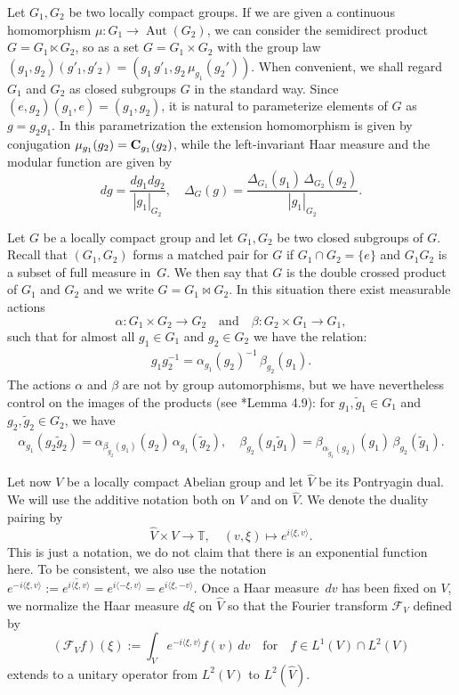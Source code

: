 \documentclass[a4paper,11pt,reqno]{amsart}
\numberwithin{equation}{section}
\theoremstyle{remark}
\theoremstyle{definition}
\newcommand\Aut{\operatorname{Aut}}
\newcommand\T{{\mathbb T}}
\newcommand{\CF}{\mathcal F}
\begin{document}
Let $G_1,G_2$ be two locally compact groups. If we are given a continuous homomorphism $\mu:G_1\to \Aut(G_2)$,
we can consider the semidirect product $G= G_1\ltimes G_2$, so as a set $G=G_1\times G_2$ with the group law
$(g_1,g_2)(g'_1,g'_2)=(g_1\,g'_1, g_2\,\mu_{g_1}(g_2'))$.
When convenient,  we shall regard $G_1$ and $G_2$ as closed subgroups $G$ in the standard way. Since
$(e,g_2)(g_1,e)=(g_1,g_2)$,  it is natural to parameterize elements of $G$ as $g=g_2g_1$.
In this parametrization
the extension homomorphism is given by conjugation $\mu_{g_1}(g_2)={\bf C}_{g_1}(g_2)$, while the left-invariant Haar measure
and the modular function are given by
$$
dg=\frac{dg_1dg_2}{|g_1|_{G_2}},\quad \Delta_G(g)=\frac{\Delta_{G_1}(g_1)\,\Delta_{G_2}(g_2)}{|g_1|_{G_2}}.
$$

Let $G$ be a locally compact group and  let $G_1,G_2$ be two closed subgroups of $G$.
Recall that $(G_1,G_2)$ forms a matched pair for $G$ if
 $G_1\cap G_2=\{e\}$ and  $G_1 G_2$ is a subset of full measure in~$G$. We then say that $G$ is the double crossed product of $G_1$
 and $G_2$ and we write $G=G_1\bowtie G_2$.
In this situation there exist  measurable actions
\begin{equation*}
\alpha :G_1\times G_2\to G_2\quad \mbox{and}\quad
\beta:G_2\times G_1\to G_1,
\end{equation*}
such that for almost all $g_1\in G_1$ and $g_2\in G_2$ we have the relation:
\begin{align*}
g_1g_2^{-1}=\alpha _{g_1}(g_2)^{-1}\,\beta_{g_2}(g_1).
\end{align*}
The actions $\alpha$ and $\beta$ are not  by group automorphisms, but we have nevertheless control
on the images of the products (see \cite{VV}*{Lemma 4.9}): for  $g_1,\tilde g_1\in G_1$ and $g_2,\tilde g_2\in G_2$, we have
\begin{align}
\label{CP}
\alpha_{g_1 }(g_2\tilde g_2)=\alpha_{\beta_{\tilde g_2}(g_1 )}(g_2 )\,\alpha_{g_1 }(\tilde g_2 ),\quad \beta_{g_2 }(g_1\tilde g_1)=\beta_{\alpha_{\tilde g_1}(g_2 )}(g_1 )\,
\beta_{g_2}(\tilde g_1).
\end{align}


Let now  $V$ be a locally compact Abelian group and let $\hat V$ be its Pontryagin dual.
 We will use the additive notation both on $V$ and  on $\hat V$.
We denote the duality pairing by
$$
\hat V\times V\to \T,\quad (v,\xi)\mapsto e^{i\langle\xi,v\rangle}.
$$
 This is just a notation, we do not claim that
there is an exponential function here. To be consistent,  we also use the notation
$e^{-i\langle\xi,v\rangle}:=\overline{e^{i\langle\xi,v\rangle}}=e^{i\langle-\xi,v\rangle}=e^{i\langle\xi,-v\rangle}$.
Once  a Haar  measure~$dv$ has been fixed on $V$, we normalize the Haar measure $d\xi$ on $\hat V$ so that the Fourier
transform $\CF_V$ defined by
$$
(\CF_Vf)(\xi):=\int_V e^{-i\langle\xi,v\rangle} f(v)\,dv\quad\text{for}\quad f\in L^1(V)\cap L^2(V)
$$
extends to a unitary operator from $L^2(V)$ to $L^2(\hat V)$.
\end{document}
